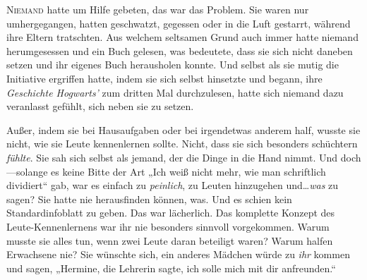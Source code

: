 \lettrine{N}{iemand} hatte um Hilfe gebeten, das war das Problem. Sie waren nur umhergegangen, hatten geschwatzt, gegessen oder in die Luft gestarrt, während ihre Eltern tratschten. Aus welchem seltsamen Grund auch immer hatte niemand herumgesessen und ein Buch gelesen, was bedeutete, dass sie sich nicht daneben setzen und ihr eigenes Buch herausholen konnte. Und selbst als sie mutig die Initiative ergriffen hatte, indem sie sich selbst hinsetzte und begann, ihre \emph{Geschichte Hogwarts’} zum dritten Mal durchzulesen, hatte sich niemand dazu veranlasst gefühlt, sich neben sie zu setzen.

Außer, indem sie bei Hausaufgaben oder bei irgendetwas anderem half, wusste sie nicht, wie sie Leute kennenlernen sollte. Nicht, dass sie sich besonders schüchtern \emph{fühlte}. Sie sah sich selbst als jemand, der die Dinge in die Hand nimmt. Und doch—solange es keine Bitte der Art „Ich weiß nicht mehr, wie man schriftlich dividiert“ gab, war es einfach zu \emph{peinlich}, zu Leuten hinzugehen und…\emph{was} zu sagen? Sie hatte nie herausfinden können, was. Und es schien kein Standardinfoblatt zu geben. Das war lächerlich. Das komplette Konzept des Leute-Kennenlernens war ihr nie besonders sinnvoll vorgekommen. Warum musste sie alles tun, wenn zwei Leute daran beteiligt waren? Warum halfen Erwachsene nie? Sie wünschte sich, ein anderes Mädchen würde zu \emph{ihr} kommen und sagen, „Hermine, die Lehrerin sagte, ich solle mich mit dir anfreunden.“

